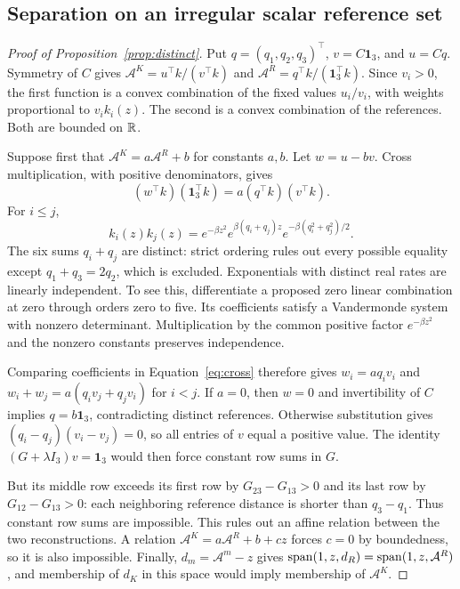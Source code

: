 \subsection{Separation on an irregular scalar reference set}
\begin{proof}[Proof of Proposition~\ref{prop:distinct}]
Put $q=(q_1,q_2,q_3)^\top$, $v=C\mathbf1_3$, and $u=Cq$. Symmetry of $C$ gives
$\mathcal A^K=u^\top k/(v^\top k)$ and $\mathcal A^R=q^\top k/(\mathbf1_3^\top k)$.
Since $v_i>0$, the first function is a convex combination of the fixed values $u_i/v_i$, with weights proportional to $v_ik_i(z)$. The second is a convex combination of the references. Both are bounded on $\mathbb R$.

Suppose first that $\mathcal A^K=a\mathcal A^R+b$ for constants $a,b$. Let $w=u-bv$. Cross multiplication, with positive denominators, gives
\begin{equation}
 (w^\top k)(\mathbf1_3^\top k)=a(q^\top k)(v^\top k).
 \label{eq:cross}
\end{equation}
For $i\leq j$,
\[
 k_i(z)k_j(z)=e^{-\beta z^2}e^{\beta(q_i+q_j)z}e^{-\beta(q_i^2+q_j^2)/2}.
\]
The six sums $q_i+q_j$ are distinct: strict ordering rules out every possible equality except $q_1+q_3=2q_2$, which is excluded. Exponentials with distinct real rates are linearly independent. To see this, differentiate a proposed zero linear combination at zero through orders zero to five. Its coefficients satisfy a Vandermonde system with nonzero determinant. Multiplication by the common positive factor $e^{-\beta z^2}$ and the nonzero constants preserves independence.

Comparing coefficients in Equation~\eqref{eq:cross} therefore gives $w_i=aq_iv_i$ and $w_i+w_j=a(q_iv_j+q_jv_i)$ for $i<j$. If $a=0$, then $w=0$ and invertibility of $C$ implies $q=b\mathbf1_3$, contradicting distinct references. Otherwise substitution gives $(q_i-q_j)(v_i-v_j)=0$, so all entries of $v$ equal a positive value. The identity $(G+\lambda I_3)v=\mathbf1_3$ would then force constant row sums in $G$.

But its middle row exceeds its first row by $G_{23}-G_{13}>0$ and its last row by $G_{12}-G_{13}>0$: each neighboring reference distance is shorter than $q_3-q_1$. Thus constant row sums are impossible. This rules out an affine relation between the two reconstructions. A relation $\mathcal A^K=a\mathcal A^R+b+cz$ forces $c=0$ by boundedness, so it is also impossible. Finally, $d_m=\mathcal A^m-z$ gives
$\operatorname{span}(1,z,d_R)=\operatorname{span}(1,z,\mathcal A^R)$, and membership of $d_K$ in this space would imply membership of $\mathcal A^K$.
\end{proof}

